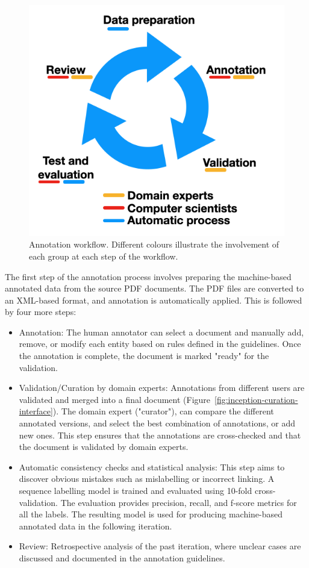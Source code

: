 \begin{figure}[htbp]
\centering
  \centering
  \includegraphics[width=0.5\linewidth]{figures/supermat/Fig2.png}
  \caption{Annotation workflow. Different colours illustrate the involvement of each group at each step of the workflow.}
  \label{fig:schema-comparison-modified-workflow}
\end{figure}

The first step of the annotation process involves preparing the machine-based annotated data from the source PDF documents. 
The PDF files are converted to an XML-based format, and annotation is automatically applied. 
This is followed by four more steps: 

\begin{itemize}
\item Annotation: The human annotator can select a document and manually add, remove, or modify each entity based on rules defined in the guidelines. Once the annotation is complete, the document is marked "ready" for the validation. 

\item Validation/Curation by domain experts: Annotations from different users are validated and merged into a final document (Figure~\ref{fig:inception-curation-interface}). 
The domain expert ("curator"), can compare the different annotated versions, and select the best combination of annotations, or add new ones. 
This step ensures that the annotations are cross-checked and that the document is validated by domain experts.

\item Automatic consistency checks and statistical analysis: This step aims to discover obvious mistakes such as mislabelling or incorrect linking. 
A sequence labelling model is trained and evaluated using 10-fold cross-validation. The evaluation provides precision, recall, and f-score metrics for all the labels.
The resulting model is used for producing machine-based annotated data in the following iteration.

\item Review: Retrospective analysis of the past iteration, where unclear cases are discussed and documented in the annotation guidelines. 

\end{itemize}

